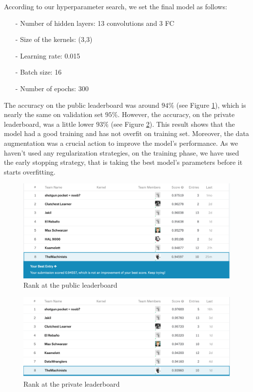 \documentclass[a4paper]{article}
\begin{document}
According to our hyperparameter search, we set the final model as follows:
\begin{itemize}
\setlength\itemsep{0em}
\item[-]Number of hidden layers: 13 convolutions and 3 FC
\item[-]Size of the kernels: (3,3)
\item[-]Learning rate: 0.015
\item[-]Batch size: 16
\item[-]Number of epochs: 300
\end{itemize}
%
The accuracy on the public leaderboard was around $94\%$ (see Figure \ref{fig:kaggle}), which is nearly the same on validation set $95\%$. However, the accuracy, on the private leaderboard, was a little lower  $93\%$ (see Figure \ref{fig:kagpriv}). This result shows that the model had a good training and has not overfit on training set. Moreover, the data augmentation was a crucial action to improve the model's performance.
%
As we haven't used any regularization strategies, on the training phase, we have used the early stopping strategy, that is taking the best model's parameters before it starts overfitting.

\begin{figure}[h!]
	\centering
	\includegraphics[scale=.4]{kaggle.png}
	\caption{Rank at the public leaderboard}
	\label{fig:kaggle}
\end{figure}

\begin{figure}[h!]
	\centering
	\includegraphics[scale=.4]{kagglepriv.png}
	\caption{Rank at the private leaderboard}
	\label{fig:kagpriv}
\end{figure}
\end{document}
